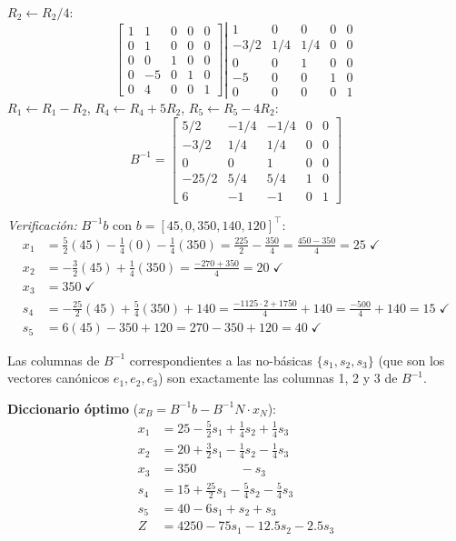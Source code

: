 \documentclass{article}
\begin{document}
\begin{enumerate}[a)]
\[\]
$R_2\leftarrow R_2/4$:
\[
\begin{bmatrix}1&1&0&0&0\\0&1&0&0&0\\0&0&1&0&0\\0&-5&0&1&0\\0&4&0&0&1\end{bmatrix}
\left|\begin{array}{ccccc}1&0&0&0&0\\-3/2&1/4&1/4&0&0\\0&0&1&0&0\\-5&0&0&1&0\\0&0&0&0&1\end{array}\right.
\]
$R_1\leftarrow R_1-R_2$, $R_4\leftarrow R_4+5R_2$, $R_5\leftarrow R_5-4R_2$:
\[
B^{-1}=\begin{bmatrix}
5/2 & -1/4 & -1/4 & 0 & 0\\
-3/2 & 1/4 & 1/4 & 0 & 0\\
0 & 0 & 1 & 0 & 0\\
-25/2 & 5/4 & 5/4 & 1 & 0\\
6 & -1 & -1 & 0 & 1
\end{bmatrix}
\]

\textit{Verificación:} $B^{-1}b$ con $b=[45,0,350,140,120]^\top$:
\begin{align*}
x_1 &= \tfrac{5}{2}(45)-\tfrac{1}{4}(0)-\tfrac{1}{4}(350)=\tfrac{225}{2}-\tfrac{350}{4}=\tfrac{450-350}{4}=25\;\checkmark\\
x_2 &= -\tfrac{3}{2}(45)+\tfrac{1}{4}(350)=\tfrac{-270+350}{4}=20\;\checkmark\\
x_3 &= 350\;\checkmark\\
s_4 &= -\tfrac{25}{2}(45)+\tfrac{5}{4}(350)+140=\tfrac{-1125\cdot2+1750}{4}+140=\tfrac{-500}{4}+140=15\;\checkmark\\
s_5 &= 6(45)-350+120=270-350+120=40\;\checkmark
\end{align*}

Las columnas de $B^{-1}$ correspondientes a las no-básicas $\{s_1,s_2,s_3\}$ (que son los vectores canónicos $e_1,e_2,e_3$) son exactamente las columnas 1, 2 y 3 de $B^{-1}$.

\textbf{Diccionario óptimo} ($x_B = B^{-1}b - B^{-1}N\cdot x_N$):
$$\begin{aligned}
x_1 &= 25 - \tfrac{5}{2}s_1 + \tfrac{1}{4}s_2 + \tfrac{1}{4}s_3 \\
x_2 &= 20 + \tfrac{3}{2}s_1 - \tfrac{1}{4}s_2 - \tfrac{1}{4}s_3 \\
x_3 &= 350 \phantom{{}+00s_1\;} - s_3 \\
s_4 &= 15 + \tfrac{25}{2}s_1 - \tfrac{5}{4}s_2 - \tfrac{5}{4}s_3 \\
s_5 &= 40 - 6s_1 + s_2 + s_3 \\
Z   &= 4250 - 75s_1 - 12.5s_2 - 2.5s_3
\end{aligned}$$


\end{enumerate}
\end{document}
